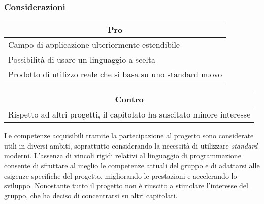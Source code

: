 \subsubsection{Considerazioni}
\begin{minipage}[t]{0.45\linewidth}
    \vspace{0pt}
    {\renewcommand{\arraystretch}{1.5}
    \begin{tabular}{p{1\linewidth}}
        \multicolumn{1}{c}{\textbf{Pro}} \\
        \midrule
        Campo di applicazione ulteriormente estendibile \\
        Possibilità di usare un linguaggio a scelta     \\
        Prodotto di utilizzo reale che si basa su uno standard nuovo \\
        \hline
    \end{tabular}
    }
\end{minipage}
\hspace{0.05\linewidth}
\begin{minipage}[t]{0.45\linewidth}
    \vspace{0pt}
    {\renewcommand{\arraystretch}{1.5}
    \begin{tabular}{p{1\linewidth}}
        \multicolumn{1}{c}{\textbf{Contro}} \\
        \midrule
        Rispetto ad altri progetti, il capitolato ha suscitato minore interesse \\
        \hline
    \end{tabular}
    }
\end{minipage}
\vspace{1em}

Le competenze acquisibili tramite la partecipazione al progetto sono considerate utili in diversi ambiti, soprattutto considerando la necessità di utilizzare \textit{standard} moderni.
L'assenza di vincoli rigidi relativi al linguaggio di programmazione consente di sfruttare al meglio le competenze attuali del gruppo e di adattarsi alle esigenze specifiche del progetto, migliorando le prestazioni e accelerando lo sviluppo.
Nonostante tutto il progetto non è riuscito a stimolare l'interesse del gruppo, che ha deciso di concentrarsi su altri capitolati.